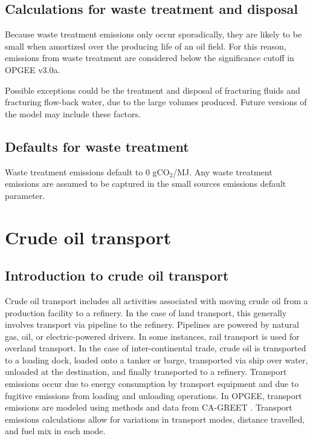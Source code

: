 \documentclass[11pt]{report}
\newcommand{\marg}[1]{{\footnotesize\textit{\textcolor{stanford}{'#1'}}}}
\newcommand{\marginnote}[1]{\marginpar{\marg{#1}}}
\newcommand{\version}{v3.0a}
\begin{document}
{\subsection{Calculations for waste treatment and disposal}

Because waste treatment emissions only occur sporadically, they are likely to be small when amortized over the producing life of an oil field. For this reason, emissions from waste treatment are considered below the significance cutoff in OPGEE \version.

Possible exceptions could be the treatment and disposal of fracturing fluids and fracturing flow-back water, due to the large volumes produced. Future versions of the model may include these factors.

\subsection{Defaults for waste treatment}

Waste treatment emissions default to 0 gCO$_2$/MJ. \marginnote{Active Field 3.6} Any waste treatment emissions are assumed to be captured in the small sources emissions default parameter. 



\clearpage

\section{Crude oil transport}
 \label{sec:transport}

\subsection{Introduction to crude oil transport}

Crude oil transport includes all activities associated with moving crude oil from a production facility to a refinery. In the case of land transport, this generally involves transport via pipeline to the refinery. Pipelines are powered by natural gas, oil, or electric-powered drivers. In some instances, rail transport is used for overland transport. In the case of inter-continental trade, crude oil is transported to a loading dock, loaded onto a tanker or barge, transported via ship over water, unloaded at the destination, and finally transported to a refinery.
Transport emissions occur due to energy consumption by transport equipment and due to fugitive emissions from loading and unloading operations. In OPGEE, transport emissions are modeled using methods and data from CA-GREET \cite{Wang2009}. Transport emissions calculations allow for variations in transport modes, distance travelled, and fuel mix in each mode. 


}
\end{document}
